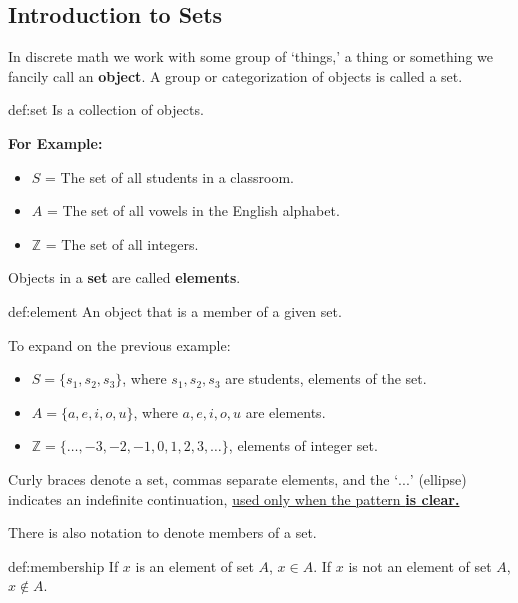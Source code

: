 \subsection{Introduction to Sets}
\hspace*{1em}
In discrete math we work with some group of `things,' a thing or something
we fancily call an \textbf{object}. A group or categorization of objects is called a set.

\begin{Def}[Set]{def:set}
    Is a collection of objects.
\end{Def}

\noindent
\textbf{For Example:}
\begin{itemize}
    \item $S$ = The set of all students in a classroom.
    \item $A$ = The set of all vowels in the English alphabet.
    \item $\mathbb{Z}$ = The set of all integers.

\end{itemize}
Objects in a \textbf{set} are called \textbf{elements}.

\begin{Def}[Element]{def:element}
    An object that is a member of a given set.
\end{Def}

\noindent
To expand on the previous example:
\begin{itemize}
    \item $S = \{s_1, s_2, s_3\}$, where $s_1, s_2, s_3$ are students, elements of the set.
    \item $A = \{a, e, i, o, u\}$, where $a, e, i, o, u$ are elements.
    \item $\mathbb{Z} = \{\ldots, -3, -2, -1, 0, 1, 2, 3, \ldots\}$, elements of integer set.
\end{itemize}
Curly braces denote a set, commas separate elements, and
the `$...$' (ellipse) indicates an indefinite continuation, \underline{used only when the pattern \textbf{is clear.}}\\

\newpage

\noindent
There is also notation to denote members of a set.

\begin{Def}[Membership]{def:membership}
    If $x$ is an element of set $A$, $x \in A$.
    If $x$ is not an element of set $A$, $x \notin A$.
\end{Def}

